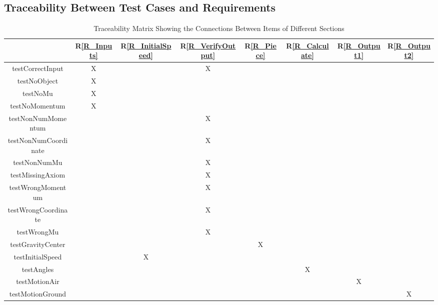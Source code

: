 \documentclass[12pt, titlepage]{article}
\newcommand{\rref}[1]{R\ref{#1}}
\begin{document}

\subsection{Traceability Between Test Cases and Requirements}

\begin{table}[h!]
	\centering
	\begin{tabular}{|c|c|c|c|c|c|c|c|}
		\hline        
		& \rref{R_Inputs} & \rref{R_InitialSpeed} & \rref{R_VerifyOutput}& \rref{R_Piece} &\rref{R_Calculate} & \rref{R_Output1}&\rref{R_Output2} \\
		\hline
		testCorrectInput &X & &X & & & &\\ \hline
		testNoObject &X & & & & & &\\ \hline
		testNoMu &X & & & & & &\\ \hline
		testNoMomentum &X & & & & & &\\ \hline
		testNonNumMomentum & & &X & & & &\\ \hline
		testNonNumCoordinate & & &X & & & &\\ \hline
		testNonNumMu & & &X & & & &\\ \hline
		testMissingAxiom & & &X & & & &\\ \hline
		testWrongMomentum & & &X & & & &\\ \hline
		testWrongCoordinate & & &X & & & &\\ \hline
		testWrongMu & & &X & & & &\\ \hline
		testGravityCenter & & & &X & & &\\ \hline
		testInitialSpeed & &X & & & & &\\ \hline
		testAngles & & & & &X & &\\ \hline
		testMotionAir & & & & & &X &\\ \hline
		testMotionGround & & & & & & &X\\ \hline
	\end{tabular}
	\caption{Traceability Matrix Showing the Connections Between Items of Different Sections}
	\label{Table:trace}
\end{table}

\newpage

		
\end{document}
